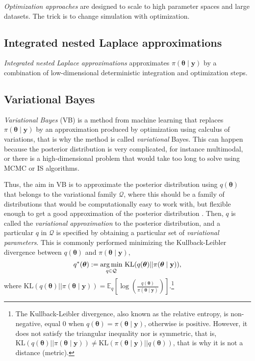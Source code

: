 \textit{Optimization approaches} are designed to scale to high parameter spaces and large datasets. The trick is to change simulation with optimization. 

\subsection{Integrated nested Laplace approximations}\label{sec15_21}
\textit{Integrated nested Laplace approximations} approximates $\pi(\boldsymbol{\theta} \mid \mathbf{y})$ by a combination of low-dimensional deterministic integration and optimization steps. 

\subsection{Variational Bayes}\label{sec15_22}
\textit{Variational Bayes} (VB) is a method from machine learning \cite{jordan1999introduction,wainwright2008graphical} that replaces $\pi(\boldsymbol{\theta} \mid \mathbf{y})$ by an approximation produced by optimization using calculus of variations, that is why the method is called \textit{variational} Bayes. This can happen because the posterior distribution is very complicated, for instance multimodal, or there is a high-dimensional problem that would take too long to solve using MCMC or IS algorithms. 

Thus, the aim in VB is to approximate the posterior distribution using $q(\boldsymbol{\theta})$ that belongs to the variational family $\mathcal{Q}$, where this should be a family of distributions that would be computationally easy to work with, but flexible enough to get a good approximation of the posterior distribution \cite{blei2017variational}. Then, $q$ is called the \textit{variational approximation} to the posterior distribution, and a particular $q$ in $\mathcal{Q}$ is specified by obtaining a particular set of \textit{variational parameters}. This is commonly performed minimizing the Kullback-Leibler divergence between $q(\boldsymbol{\theta})$ and $\pi(\boldsymbol{\theta} \mid \mathbf{y})$,
\begin{align}\label{eq:VB1}
	q^*(\boldsymbol{\theta}):=\underset{q \in \mathcal{Q}}{\argmin} \  \text{KL}(q(\boldsymbol{\theta})||\pi(\boldsymbol{\theta} \mid \mathbf{y})),
\end{align}  
where $\text{KL}(q(\boldsymbol{\theta})||\pi(\boldsymbol{\theta} \mid \mathbf{y}))=\mathbb{E}_q\left[\log\left(\frac{q(\boldsymbol{\theta})}{\pi(\boldsymbol{\theta} \mid \mathbf{y})}\right)\right]$.\footnote{The Kullback-Leibler divergence, also known as the relative entropy, is non-negative, equal 0 when $q(\boldsymbol{\theta})=\pi(\boldsymbol{\theta} \mid \mathbf{y})$, otherwise is positive. However, it does not satisfy the triangular inequality nor is symmetric, that is, $\text{KL}(q(\boldsymbol{\theta})||\pi(\boldsymbol{\theta} \mid \mathbf{y}))\neq \text{KL}(\pi(\boldsymbol{\theta} \mid \mathbf{y})||q(\boldsymbol{\theta}))$, that is why it is not a distance (metric).} 

